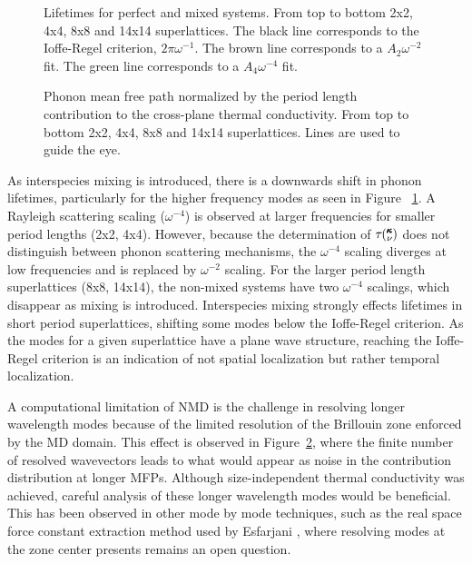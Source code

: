 \documentclass[aps,prb,preprint,preprintnumbers,amsmath,amssymb,floatfix,superscriptaddress]{revtex4}
\newcommand{\kv}{\mspace{-4.0mu}\left(\mspace{-8.0mu}
\begin{smallmatrix}&\pmb{\kappa} \\&\nu\end{smallmatrix}
\mspace{-3.0mu}\right)}
\begin{document}
\renewcommand{\textfraction}{0.0}
\begin{figure}%
\begin{center}
\renewcommand{\figure}{Fig.}
\caption{Lifetimes for perfect and mixed systems. From top to bottom 2x2, 4x4, 8x8 and 14x14 superlattices. The black line corresponds to the Ioffe-Regel criterion, $2\pi\omega^{-1}$. The brown line corresponds to a $A_2\omega^{-2}$ fit. The green line corresponds to a $A_4\omega^{-4}$ fit.}
\label{FIG:lifetime}
\end{center}
\end{figure}
\begin{figure}%
\begin{center}
\renewcommand{\figure}{Fig.}
\caption{Phonon mean free path normalized by the period length contribution to the cross-plane thermal conductivity. From top to bottom 2x2, 4x4, 8x8 and 14x14 superlattices. Lines are used to guide the eye.}
\label{FIG:MFP_cp}
\end{center}
\end{figure}
As interspecies mixing is introduced, there is a downwards shift in phonon lifetimes, particularly for the higher frequency modes as seen in Figure ~\ref{FIG:lifetime}. A Rayleigh scattering scaling ($\omega^{-4}$) is observed at larger frequencies for smaller period lengths (2x2, 4x4). However, because the determination of $\tau\kv$ does not distinguish between phonon scattering mechanisms, the $\omega^{-4}$ scaling diverges at low frequencies and is replaced by $\omega^{-2}$ scaling. For the larger period length superlattices (8x8, 14x14), the non-mixed systems have two $\omega^{-4}$ scalings, which disappear as mixing is introduced. Interspecies mixing strongly effects lifetimes in short period superlattices, shifting some modes below the Ioffe-Regel criterion. As the modes for a given superlattice have a plane wave structure, reaching the Ioffe-Regel criterion is an indication of not spatial localization but rather temporal localization.

A computational limitation of NMD is the challenge in resolving longer wavelength modes because of the limited resolution of the Brillouin zone enforced by the MD domain. This effect is observed in Figure~\ref{FIG:MFP_cp}, where the finite number of resolved wavevectors leads to what would appear as noise in the contribution distribution at longer MFPs. Although size-independent thermal conductivity was achieved, careful analysis of these longer wavelength modes would be beneficial. This has been observed in other mode by mode techniques, such as the real space force constant extraction method used by Esfarjani \cite{PhysRevB.84.085204}, where resolving modes at the zone center presents remains an open question.
\end{document}
